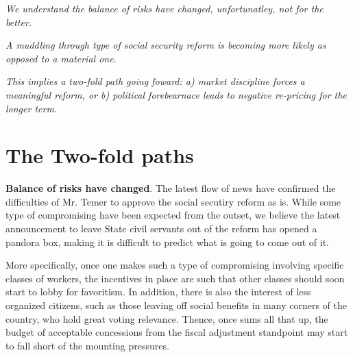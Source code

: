 \documentclass{report}
\date{}
\title{}
\begin{document}
\thispagestyle{firststyle}
\JournalIssue

    \begin{tcolorbox}[colbak=red!5!white, colframe=red!0!white]
      \begin{compactitem}
      \item \textit{We understand the balance of risks have changed, unfortunatley, not for the better.}
      \item \textit{A muddling through type of social security reform is becoming more likely as opposed to a material one.}
      \item \textit{This implies a two-fold path going foward: a) market discipline forces a meaningful reform, or b) political forebearnace leads to negative re-pricing for the longer term.}
      \end{compactitem}
    \end{tcolorbox}
\vspace{-0.5cm}

\section{The Two-fold paths}
\label{sec:org10a1df2}
\begin{compactitem}[$\diamond$]
\item \textbf{Balance of risks have changed}. The latest flow of news have
confirmed the difficulties of Mr. Temer to approve the social
secutiry reform as is. While some type of compromising have been
expected from the outset, we believe the latest announcement to
leave State civil servants out of the reform has opened a pandora
box, making it is difficult to predict what is going to come out of
it.

More specifically, once one makes such a type of compromising
involving specific classes of workers, the incentives in place are
such that other classes should soon start to lobby for
favoritism. In addition, there is also the interest of less
organized citizens, such as those leaving off social benefits in
many corners of the country, who hold great voting
relevance. Thence, once sums all that up, the budget of acceptable
concessions from the fiscal adjustment standpoint may start to fall
short of the mounting pressures.
\end{compactitem}
\end{document}
